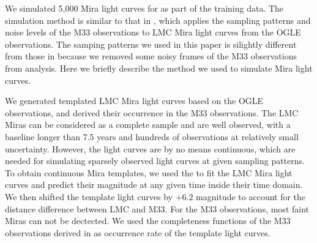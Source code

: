 We simulated 5,000 Mira light curves for as part of the training data. The simulation method is similar to that in , which applies the sampling patterns and noise levels of the M33 observations to LMC Mira light curves from the OGLE observations. The samping patterns we used in this paper is silightly different from those in  because we removed some noisy frames of the M33 observations from analysis. Here we briefly describe the method we used to simulate Mira light curves.

We generated templated LMC Mira light curves based on the OGLE observations, and derived their occurrence in the M33 observations. The LMC Miras can be considered as a complete sample and are well observed, with a baseline longer than 7.5 years and hundreds of observations at relatively small uncertainty. However, the light curves are by no means continuous, which are needed for simulating sparsely observed light curves at given sampling patterns. To obtain continuous Mira templates, we used the  to fit the LMC Mira light curves and predict their magnitude at any given time inside their time domain. We then shifted the template light curves by $+6.2$ magnitude to account for the distance difference between LMC and M33. For the M33 observations, most faint Miras can not be dectected. We used the completeness functions of the M33 observations derived in  as occurrence rate of the template light curves.

